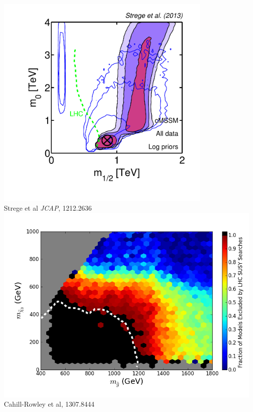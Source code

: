 \documentclass[xcolor=dvipsnames]{beamer}
\begin{document}
\begin{frame}
\begin{columns}[c]
\includegraphics[width=0.8\textwidth, trim = 40 40 0 40, clip=true]{Strege13}\\\vspace{-1mm}
{\tiny Strege et al \textit{JCAP}, 1212.2636}\\\vspace{3mm}
\includegraphics[width=\textwidth]{LSP_Gluino_13_Efficiency}\\
{\tiny Cahill-Rowley et al, 1307.8444}\\\vspace{3mm}


\end{columns}
\end{frame}
\end{document}
